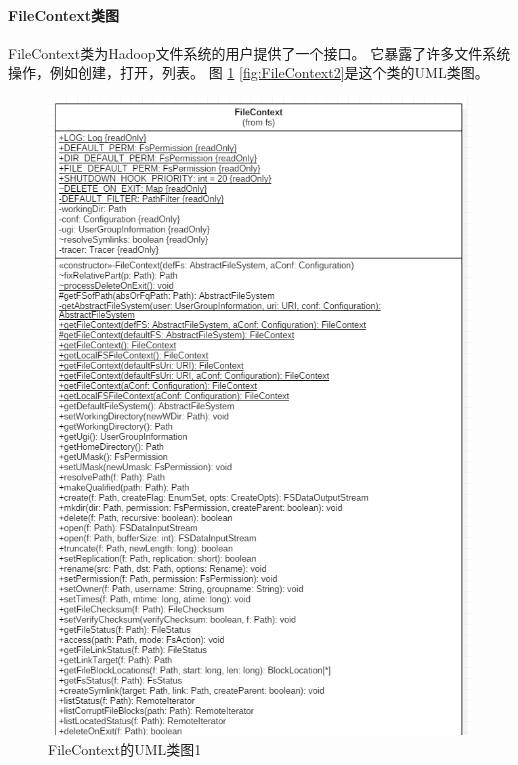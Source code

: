 \paragraph{FileContext类图}
FileContext类为Hadoop文件系统的用户提供了一个接口。 它暴露了许多文件系统操作，例如创建，打开，列表。
图 \ref{fig:FileContext1} \ref{fig:FileContext2}是这个类的UML类图。
\begin{figure}
\centering
\includegraphics[width=1\linewidth]{UML/abstractfilesystem/FileContext1.PNG}
\caption{FileContext的UML类图1}
\label{fig:FileContext1}
\end{figure}

